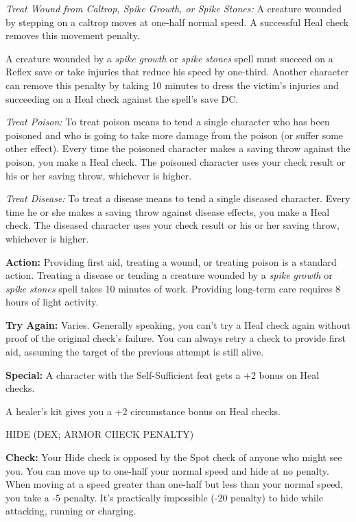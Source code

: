 \documentclass{article}
\begin{document}
\textit{Treat Wound from Caltrop, Spike Growth, or Spike Stones: }A creature wounded 
by stepping on a caltrop moves at one-half normal speed. A successful Heal check 
removes this movement penalty.

A creature wounded by a \textit{spike growth }or \textit{spike stones }spell must 
succeed on a Reflex save or take injuries that reduce his speed by one-third. Another 
character can remove this penalty by taking 10 minutes to dress the victim's injuries 
and succeeding on a Heal check against the spell's save DC.

\textit{Treat Poison: }To treat poison means to tend a single character who has 
been poisoned and who is going to take more damage from the poison (or suffer some 
other effect). Every time the poisoned character makes a saving throw against the 
poison, you make a Heal check. The poisoned character uses your check result or 
his or her saving throw, whichever is higher.

\textit{Treat Disease: }To treat a disease means to tend a single diseased character. 
Every time he or she makes a saving throw against disease effects, you make a Heal 
check. The diseased character uses your check result or his or her saving throw, 
whichever is higher.

\textbf{Action:} Providing first aid, treating a wound, or treating poison is a 
standard action. Treating a disease or tending a creature wounded by a \textit{spike 
growth }or \textit{spike stones }spell takes 10 minutes of work. Providing long-term 
care requires 8 hours of light activity.

\textbf{Try Again:} Varies. Generally speaking, you can't try a Heal check again 
without proof of the original check's failure. You can always retry a check to 
provide first aid, assuming the target of the previous attempt is still alive.

\textbf{Special:} A character with the Self-Sufficient feat gets a +2 bonus on 
Heal checks.

A healer's kit gives you a +2 circumstance bonus on Heal checks.

\vspace{12pt}
HIDE (DEX; ARMOR CHECK PENALTY)

\textbf{Check:} Your Hide check is opposed by the Spot check of anyone who might 
see you. You can move up to one-half your normal speed and hide at no penalty. 
When moving at a speed greater than one-half but less than your normal speed, you 
take a -5 penalty. It's practically impossible (-20 penalty) to hide while attacking, 
running or charging.
\end{document}
